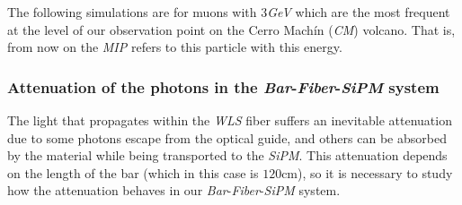 \documentclass[submitting]{nst}
\begin{document}
The following simulations are for muons with $3$\textsl{GeV} which are the most frequent at the level of our observation point on the Cerro Machín (\textsl{CM}) volcano. That is, from now on the \textsl{MIP} refers to this particle with this energy.

\subsubsection{Attenuation of the photons in the \textsl{Bar}-\textsl{Fiber}-\textsl{SiPM} system}%
The light that propagates within the \textsl{WLS} fiber suffers an inevitable attenuation due to some photons escape from the optical guide, and others can be absorbed by the material while being transported to the \textsl{SiPM}. This attenuation depends on the length of the bar (which in this case is $120$cm), so it is necessary to study how the attenuation behaves in our \textsl{Bar}-\textsl{Fiber}-\textsl{SiPM} system. 
\end{document}
